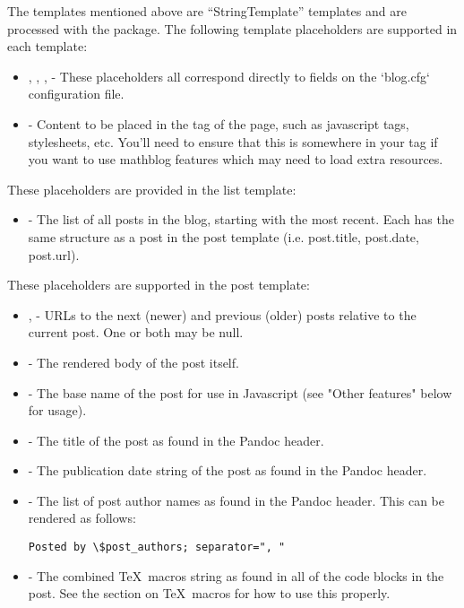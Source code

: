 \documentclass[11pt, letterpaper, oneside, titlepage]{book}
\begin{document}
The templates mentioned above are ``StringTemplate'' templates and are
processed with the  package.  The following
template placeholders are supported in each template:

\begin{itemize}
\item{, , ,
   - These placeholders all correspond directly to
  fields on the `blog.cfg` configuration file.}
\item{ - Content to be placed in the 
  tag of the page, such as javascript tags, stylesheets, etc.  You'll
  need to ensure that this is somewhere in your  tag if you
  want to use mathblog features which may need to load extra
  resources.}
\end{itemize}

These placeholders are provided in the list template:

\begin{itemize}
\item{ - The list of all posts in the blog, starting with
  the most recent.  Each has the same structure as a post in the post
  template (i.e. post.title, post.date, post.url).}
\end{itemize}

These placeholders are supported in the post template:

\begin{itemize}
\item{,  - URLs to the
  next (newer) and previous (older) posts relative to the current
  post.  One or both may be null.}
\item{ - The rendered body of the post itself.}
\item{ - The base name of the post for use in
  Javascript (see "Other features" below for usage).}
\item{ - The title of the post as found in the Pandoc
  header.}
\item{ - The publication date string of the post as
  found in the Pandoc header.}
\item{ - The list of post author names as found in
  the Pandoc header.  This can be rendered as follows:
\begin{verbatim}
Posted by \$post_authors; separator=", "
\end{verbatim}
}
\item{ - The combined \TeX\ macros string as
  found in all of the  code blocks in the post.  See
  the section on \TeX\ macros for how to use this properly.}
\end{itemize}
\end{document}
